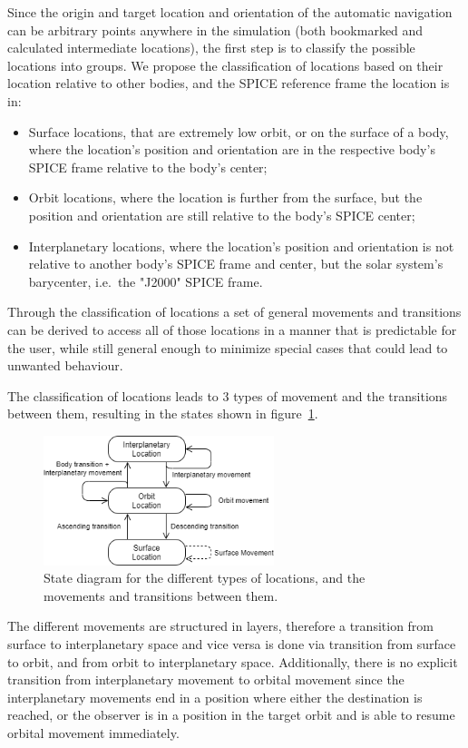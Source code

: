 Since the origin and target location and orientation of the automatic navigation can be arbitrary points anywhere in
the simulation (both bookmarked and calculated intermediate locations), the first step is to classify the possible
locations into groups.
We propose the classification of locations based on their location relative to other bodies, and the SPICE reference
frame the location is in:
\newpage
\begin{itemize}
    \item Surface locations, that are extremely low orbit, or on the surface of a body, where the location's position
    and orientation are in the respective body's SPICE frame relative to the body's center;
    \item Orbit locations, where the location is further from the surface, but the position and orientation
    are still relative to the body's SPICE center;
    \item Interplanetary locations, where the location's position and orientation is not relative to another body's
    SPICE frame and center, but the solar system's barycenter, i.e.\ the "J2000" SPICE frame.
\end{itemize}
Through the classification of locations a set of general movements and transitions can be derived to access all of
those locations in a manner that is predictable for the user, while still general enough to minimize special cases
that could lead to unwanted behaviour.

The classification of locations leads to 3 types of movement and the transitions between them, resulting in the states
shown in figure~\ref{fig:nav-states}.

\begin{figure}[h]
    \centering
    \includegraphics[width=0.6\textwidth]{content/4_3_autoNavigation/img/NavigationLocationStates}
    \caption{State diagram for the different types of locations, and the movements and transitions between them.}
    \label{fig:nav-states}
\end{figure}

The different movements are structured in layers, therefore a transition from surface to interplanetary space and
vice versa is done via transition from surface to orbit, and from orbit to interplanetary space.
Additionally, there is no explicit transition from interplanetary movement to orbital movement since the interplanetary
movements end in a position where either the destination is reached, or the observer is in a position in the target
orbit and is able to resume orbital movement immediately.

